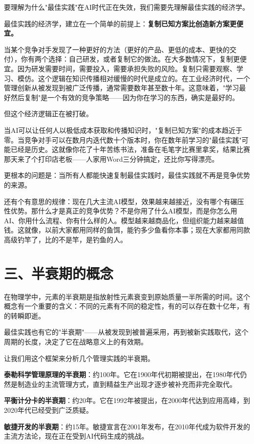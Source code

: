 要理解为什么"最佳实践"在AI时代正在失效，我们需要先理解最佳实践的经济学。

最佳实践的经济学，建立在一个简单的前提上：\textbf{复制已知方案比创造新方案更便宜。}

当某个竞争对手发现了一种更好的方法（更好的产品、更低的成本、更快的交付），你有两个选择：自己研发，或者复制它的做法。在大多数情况下，复制更便宜。因为研发需要时间，需要投入，需要承担失败的风险。复制只需要观察、学习、模仿。这个逻辑在知识传播相对缓慢的时代是成立的。在工业经济时代，一个管理创新从被发现到被广泛传播，通常需要数年甚至数十年。这意味着，"学习最好然后复制"是一个有效的竞争策略——因为你在学习的东西，确实是最好的。

但这个经济逻辑正在被打破。

当AI可以让任何人以极低成本获取和传播知识时，"复制已知方案"的成本趋近于零。当竞争对手可以在数月内迭代数十个版本时，你在数年前学习的"最佳实践"可能已经是历史。这就像你花了十年苦练书法，准备在毛笔字比赛里拿奖，结果比赛那天来了个打印店老板——人家用Word三分钟搞定，还比你写得漂亮。

更根本的问题是：当所有人都能快速复制最佳实践时，最佳实践就不再是竞争优势的来源。

还有个有意思的规律：现在几大主流AI模型，效果越来越接近，没有哪个有碾压性优势。那什么才是真正的竞争优势？不是你用了什么AI模型，而是你怎么用AI、你用什么流程、你有什么样的人。模型越来越商品化，但组织能力越来越值钱。这就像，以前大家都用同样的鱼饵，能钓多少鱼看你本事；现在大家都用同款高级钓竿了，比的不是竿，是钓鱼的人。

\section{三、半衰期的概念}


在物理学中，元素的半衰期是指放射性元素衰变到原始质量一半所需的时间。这个概念有一个重要的含义：不同的元素有不同的稳定性，有的可以存在数十亿年，有的转瞬即逝。

最佳实践也有它的"半衰期"——从被发现到被普遍采用，再到被新实践取代，这个周期的长度，决定了它在战略意义上的有效期。

让我们用这个框架来分析几个管理实践的半衰期。

\textbf{泰勒科学管理原理的半衰期}：约100年。它在1900年代初期被提出，在1980年代仍然是制造业的主流管理方式，直到精益生产出现才逐步被补充而非完全取代。

\textbf{平衡计分卡的半衰期}：约20年。它在1992年被提出，在2000年代达到应用高峰，到2020年代已经受到广泛质疑。

\textbf{敏捷开发的半衰期}：约15年。敏捷宣言在2001年发布，在2010年代成为软件开发的主流方法论，现在正在受到AI代码生成的挑战。

